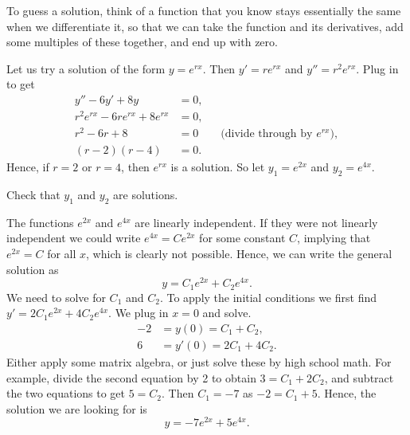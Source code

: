 \documentclass[12pt]{book}
\begin{document}
To guess a solution, think of a function that you know stays essentially the
same when we differentiate it, so that we can take the function and its
derivatives, add some multiples of these together, and end up with zero.

Let us try a solution of the form $y = e^{rx}$.  Then $y' = r e^{rx}$ and
$y'' = r^2 e^{rx}$.  Plug in to get
\begin{align*}
y''-6y'+8y & = 0 , \\
r^2 e^{rx} -6 r e^{rx}+8 e^{rx} & = 0 , \\
r^2 -6 r +8 & = 0 \qquad \text{(divide through by } e^{rx} \text{)},\\
(r-2)(r-4) & = 0 .
\end{align*}
Hence, if $r=2$ or $r=4$, then $e^{rx}$ is a solution.  So let $y_1 = e^{2x}$
and $y_2 = e^{4x}$.

\begin{exercise}
Check that $y_1$ and $y_2$ are solutions.
\end{exercise}

The functions $e^{2x}$ and $e^{4x}$ are linearly independent.  If they
were not linearly independent we could write $e^{4x} = C e^{2x}$ for
some constant $C$,
implying that $e^{2x} = C$ for all $x$, which is clearly not possible. 
Hence, we can write the general solution as
\begin{equation*}
y = C_1 e^{2x} + C_2 e^{4x} .
\end{equation*}
We need to solve for $C_1$ and $C_2$.  To apply the initial conditions
we first find $y' = 2 C_1 e^{2x} + 4 C_2 e^{4x}$.  We plug in $x=0$ and
solve.
\begin{align*}
-2 & = y(0) = C_1 + C_2 , \\
6 & = y'(0) = 2 C_1 + 4 C_2 .
\end{align*}
Either apply some matrix algebra, or just solve these by high school
math.  For example, divide the second equation by 2
to obtain $3 = C_1 + 2 C_2$, and subtract the two equations to
get $5 = C_2$.  Then $C_1 = -7$ as $-2 = C_1 + 5$.  Hence, the solution we
are
looking for is
\begin{equation*}
y = -7 e^{2x} + 5 e^{4x} .
\end{equation*}

\medskip
\end{document}
